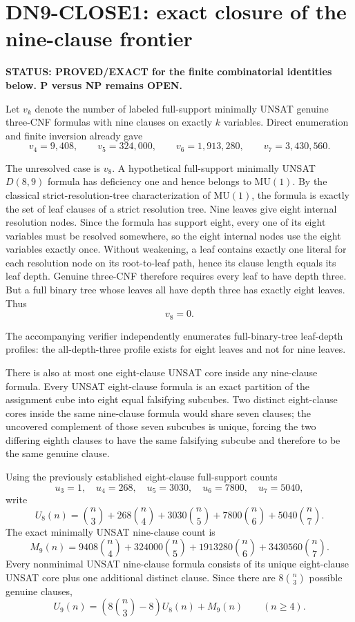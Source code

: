 \section*{DN9-CLOSE1: exact closure of the nine-clause frontier}

\textbf{STATUS: PROVED/EXACT for the finite combinatorial identities below. P versus NP remains OPEN.}

Let \(v_k\) denote the number of labeled full-support minimally UNSAT genuine
three-CNF formulas with nine clauses on exactly \(k\) variables. Direct enumeration and
finite inversion already gave
\[
v_4=9{,}408,\qquad
v_5=324{,}000,\qquad
v_6=1{,}913{,}280,\qquad
v_7=3{,}430{,}560.
\]

The unresolved case is \(v_8\). A hypothetical full-support minimally UNSAT
\(D(8,9)\) formula has deficiency one and hence belongs to \(\mathrm{MU}(1)\).
By the classical strict-resolution-tree characterization of \(\mathrm{MU}(1)\),
the formula is exactly the set of leaf clauses of a strict resolution tree. Nine leaves
give eight internal resolution nodes. Since the formula has support eight, every one of
its eight variables must be resolved somewhere, so the eight internal nodes use the
eight variables exactly once. Without weakening, a leaf contains exactly one literal for
each resolution node on its root-to-leaf path, hence its clause length equals its leaf
depth. Genuine three-CNF therefore requires every leaf to have depth three. But a full
binary tree whose leaves all have depth three has exactly eight leaves. Thus
\[
\boxed{v_8=0}.
\]

The accompanying verifier independently enumerates full-binary-tree leaf-depth profiles:
the all-depth-three profile exists for eight leaves and not for nine leaves.

There is also at most one eight-clause UNSAT core inside any nine-clause formula.
Every UNSAT eight-clause formula is an exact partition of the assignment cube into eight
equal falsifying subcubes. Two distinct eight-clause cores inside the same nine-clause
formula would share seven clauses; the uncovered complement of those seven subcubes is
unique, forcing the two differing eighth clauses to have the same falsifying subcube and
therefore to be the same genuine clause.

Using the previously established eight-clause full-support counts
\[
u_3=1,\quad u_4=268,\quad u_5=3030,\quad u_6=7800,\quad u_7=5040,
\]
write
\[
U_8(n)=\binom n3+268\binom n4+3030\binom n5+
7800\binom n6+5040\binom n7.
\]
The exact minimally UNSAT nine-clause count is
\[
M_9(n)=9408\binom n4+324000\binom n5+
1913280\binom n6+3430560\binom n7.
\]
Every nonminimal UNSAT nine-clause formula consists of its unique eight-clause UNSAT core
plus one additional distinct clause. Since there are \(8\binom n3\) possible genuine
clauses,
\[
\boxed{
U_9(n)=\left(8\binom n3-8\right)U_8(n)+M_9(n)
}\qquad(n\ge4).
\]

